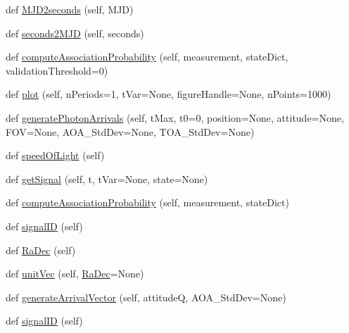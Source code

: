 \begin{DoxyCompactItemize}
\item 
def \hyperlink{classmodest_1_1signals_1_1periodicxraysource_1_1PeriodicXRaySource_a75b3899dab7d513677ec0057078a6e11}{M\+J\+D2seconds} (self, M\+JD)
\item 
def \hyperlink{classmodest_1_1signals_1_1periodicxraysource_1_1PeriodicXRaySource_a05579d0ee00b0070689a5472e2d078df}{seconds2\+M\+JD} (self, seconds)
\item 
def \hyperlink{classmodest_1_1signals_1_1periodicxraysource_1_1PeriodicXRaySource_aa978de937dca63b09fdc00a8ab927966}{compute\+Association\+Probability} (self, measurement, state\+Dict, validation\+Threshold=0)
\item 
def \hyperlink{classmodest_1_1signals_1_1periodicxraysource_1_1PeriodicXRaySource_aac2cb4da7cca8856c598e1e5a744796c}{plot} (self, n\+Periods=1, t\+Var=None, figure\+Handle=None, n\+Points=1000)
\item 
def \hyperlink{classmodest_1_1signals_1_1periodicxraysource_1_1PeriodicXRaySource_aa2cac6c15e836a557255a4b8e9ffb289}{generate\+Photon\+Arrivals} (self, t\+Max, t0=0, position=None, attitude=None, F\+OV=None, A\+O\+A\+\_\+\+Std\+Dev=None, T\+O\+A\+\_\+\+Std\+Dev=None)
\item 
def \hyperlink{classmodest_1_1signals_1_1periodicxraysource_1_1PeriodicXRaySource_ab14c776a1c0b691a509eb423da85227c}{speed\+Of\+Light} (self)
\item 
def \hyperlink{classmodest_1_1signals_1_1poissonsource_1_1DynamicPoissonSource_a01804453d22cab5811218a98557a8b0c}{get\+Signal} (self, t, t\+Var=None, state=None)
\item 
def \hyperlink{classmodest_1_1signals_1_1poissonsource_1_1DynamicPoissonSource_a6c8820d8007c848d745f9313efdb970c}{compute\+Association\+Probability} (self, measurement, state\+Dict)
\item 
def \hyperlink{classmodest_1_1signals_1_1signalsource_1_1SignalSource_a9a64c6a9c2954f6ad61e4ca3518ea8ab}{signal\+ID} (self)
\item 
def \hyperlink{classmodest_1_1signals_1_1pointsource_1_1PointSource_a295eb1a487e18c77029585ac2785db80}{Ra\+Dec} (self)
\item 
def \hyperlink{classmodest_1_1signals_1_1pointsource_1_1PointSource_a133933430a784107258901e257778221}{unit\+Vec} (self, \hyperlink{classmodest_1_1signals_1_1pointsource_1_1PointSource_a295eb1a487e18c77029585ac2785db80}{Ra\+Dec}=None)
\item 
def \hyperlink{classmodest_1_1signals_1_1pointsource_1_1PointSource_abf359a17cf5bec4c51deef87c9e92cce}{generate\+Arrival\+Vector} (self, attitudeQ, A\+O\+A\+\_\+\+Std\+Dev=None)
\item 
def \hyperlink{classmodest_1_1signals_1_1signalsource_1_1SignalSource_a9a64c6a9c2954f6ad61e4ca3518ea8ab}{signal\+ID} (self)
\end{DoxyCompactItemize}
